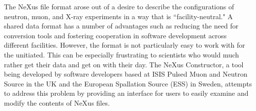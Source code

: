 The NeXus file format arose out of a desire to describe the configurations of neutron, muon, and X-ray experiments in a way that is ``facility-neutral." A shared data format has a number of advantages such as reducing the need for conversion tools and fostering cooperation in software development across different facilities. However, the format is not particularly easy to work with for the unitiated. This can be especially frustrating to scientists who would much rather get their data and get on with their day. The NeXus Constructor, a tool being developed by software developers based at ISIS Pulsed Muon and Neutron Source in the UK and the European Spallation Source (ESS) in Sweden, attempts to address this problem by providing an interface for users to easily examine and modify the contents of NeXus files.

